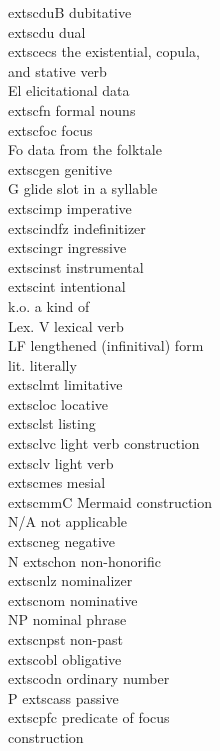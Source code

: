 \begin{multicols}{2}
\begin{tabbing}
	extsc{du}B \>  dubitative \\
	extsc{du} \>  dual \\
	extsc{ecs} \>  the existential, copula, \\ \> and stative verb \\
El \>  elicitational data \\
	extsc{fn} \>  formal nouns \\
	extsc{foc} \>  focus \\
Fo \>  data from the folktale \\
	extsc{gen} \>  genitive \\
G \>  glide slot in a syllable \\
	extsc{imp} \>  imperative \\
	extsc{indfz} \>  indefinitizer \\
	extsc{ingr} \>  ingressive \\
	extsc{inst} \>  instrumental \\
	extsc{int} \>  intentional \\
k.o. \>  a kind of \\
Lex. V \>  lexical verb \\
LF \>  lengthened (infinitival) form \\
lit. \>  literally \\
	extsc{lmt} \>  limitative \\
	extsc{loc} \>  locative \\
	extsc{lst} \>  listing \\
	extsc{lvc} \>  light verb construction \\
	extsc{lv} \>  light verb \\
	extsc{mes} \>  mesial \\
	extsc{mm}C \>  Mermaid construction \\
N/A \>  not applicable \\
	extsc{neg} \>  negative \\
N	extsc{hon} \>  non-honorific \\
	extsc{nlz} \>  nominalizer \\
	extsc{nom} \>  nominative \\
NP \>  nominal phrase \\
	extsc{npst} \>  non-past \\
	extsc{obl} \>  obligative \\
	extsc{odn} \>  ordinary number \\
P	extsc{ass} \>  passive \\
	extsc{pfc} \>  predicate of focus \\ \> construction \\

\end{tabbing}
\end{multicols}
